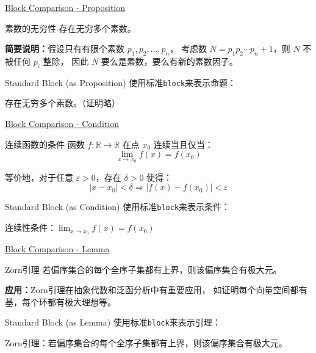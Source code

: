 \documentclass[11pt,aspectratio=43,xcolor={dvipsnames},hyperref={pdftex,pdfpagemode=UseNone,hidelinks,pdfdisplaydoctitle=true},usepdftitle=false]{ctexbeamer}
\begin{document}
\begin{frame}{\underline{Block Comparison - Proposition}}
  \begin{chdproposition}{素数的无穷性}
    存在无穷多个素数。
    
    \textbf{简要说明：}假设只有有限个素数 $p_1, p_2, \ldots, p_n$，
    考虑数 $N = p_1 p_2 \cdots p_n + 1$，则 $N$ 不被任何 $p_i$ 整除，
    因此 $N$ 要么是素数，要么有新的素数因子。
  \end{chdproposition}
  
  \vspace{0.3cm}
  
  \begin{block}{Standard Block (as Proposition)}
    使用标准\texttt{block}来表示命题：
    
    存在无穷多个素数。（证明略）
  \end{block}
\end{frame}

\begin{frame}{\underline{Block Comparison - Condition}}
  \begin{chdcondition}{连续函数的条件}
    函数 $f: \mathbb{R} \to \mathbb{R}$ 在点 $x_0$ 连续当且仅当：
    $$\lim_{x \to x_0} f(x) = f(x_0)$$
    
    等价地，对于任意 $\varepsilon > 0$，存在 $\delta > 0$ 使得：
    $$|x - x_0| < \delta \Rightarrow |f(x) - f(x_0)| < \varepsilon$$
  \end{chdcondition}
  
  \vspace{0.3cm}
  
  \begin{block}{Standard Block (as Condition)}
    使用标准\texttt{block}来表示条件：
    
    连续性条件：$\lim_{x \to x_0} f(x) = f(x_0)$
  \end{block}
\end{frame}

\begin{frame}{\underline{Block Comparison - Lemma}}
  \begin{chdlemma}{Zorn引理}
    若偏序集合的每个全序子集都有上界，则该偏序集合有极大元。
    
    \textbf{应用：}Zorn引理在抽象代数和泛函分析中有重要应用，
    如证明每个向量空间都有基，每个环都有极大理想等。
  \end{chdlemma}
  
  \vspace{0.3cm}
  
  \begin{block}{Standard Block (as Lemma)}
    使用标准\texttt{block}来表示引理：
    
    Zorn引理：若偏序集合的每个全序子集都有上界，则该偏序集合有极大元。
  \end{block}
\end{frame}
\end{document}
